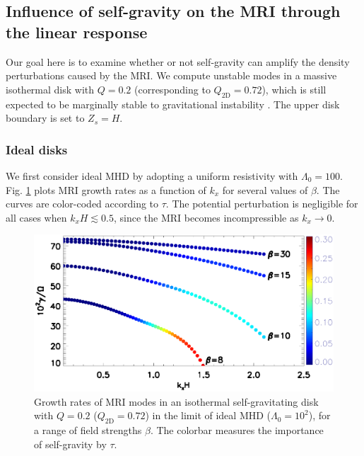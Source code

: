 

\subsection{Influence of self-gravity on the MRI through the linear
  response}  
Our goal here is to examine whether or not self-gravity can amplify
the density perturbations caused by the MRI. We compute unstable modes
in a massive isothermal disk with $Q=0.2$ (corresponding to
$Q_\mathrm{2D}=0.72$), which is still expected to be marginally  
stable to gravitational instability \citep[][who find
a critical value of  $Q\simeq 0.2$]{mamat10}.   
The upper disk boundary is set to $Z_s=H$. 


\subsubsection{Ideal disks}
We first consider ideal MHD by adopting a uniform 
resistivity with $\Lambda_0=100$. %
Fig. \ref{gravity_energy} plots MRI growth rates as a function of
$k_x$ for several values of $\beta$. The curves are color-coded
according to $\tau$. The potential perturbation is
negligible for all cases when $k_xH\lesssim 0.5$, since the MRI
becomes incompressible as $k_x\to 0$. 

\begin{figure}
  \includegraphics[width=\linewidth]{figures/compare_energy_ideal}
  \caption{Growth rates of MRI modes in an isothermal self-gravitating
    disk with $Q=0.2$ ($Q_\mathrm{2D}=0.72$) in the limit of ideal MHD
    ($\Lambda_0=10^2$), for a range of field strengths $\beta$. The
    colorbar measures the importance of self-gravity by $\tau$.  
    \label{gravity_energy}}
\end{figure}

